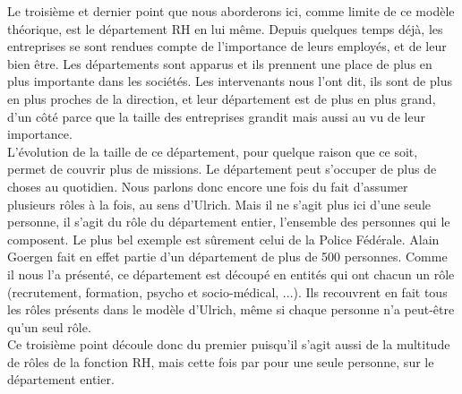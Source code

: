 
Le troisième et dernier point que nous aborderons ici, comme limite de ce modèle théorique, est le département RH en lui même. Depuis quelques temps déjà, les entreprises se sont rendues compte de l'importance de leurs employés, et de leur bien être. Les départements sont apparus et ils prennent une place de plus en plus importante dans les sociétés. Les intervenants nous l'ont dit, ils sont de plus en plus proches de la direction, et leur département est de plus en plus grand, d'un côté parce que la taille des entreprises grandit mais aussi au vu de leur importance. \\ %

L'évolution de la taille de ce département, pour quelque raison que ce soit, permet de couvrir plus de missions. Le département peut s'occuper de plus de choses au quotidien. Nous parlons donc encore une fois du fait d'assumer plusieurs rôles à la fois, au sens d'Ulrich. Mais il ne s'agit plus ici d'une seule personne, il s'agit du rôle du département entier, l'ensemble des personnes qui le composent. Le plus bel exemple est sûrement celui de la Police Fédérale. Alain Goergen fait en effet partie d'un département de plus de 500 personnes. Comme il nous l'a présenté, ce département est découpé en entités qui ont chacun un rôle (recrutement, formation, psycho et socio-médical, ...). Ils recouvrent en fait tous les rôles présents dans le modèle d'Ulrich, même si chaque personne n'a peut-être qu'un seul rôle. \\

Ce troisième point découle donc du premier puisqu'il s'agit aussi de la multitude de rôles de la fonction RH, mais cette fois par pour une seule personne, sur le département entier. \\




